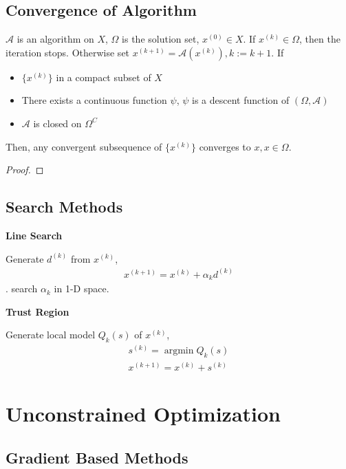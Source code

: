 \documentclass[runningheads]{llncs}
\begin{document}
\subsection{Convergence of Algorithm}
\par
\begin{theorem}
    $\mathcal{A}$ is an algorithm on $X$,
    $\Omega$ is the solution set, $x^{(0)} \in X$.
    If $x^{(k)} \in \Omega$, then the iteration stops.
    Otherwise set $x^{(k+1)} = \mathcal{A}(x^{(k)}), k:=k+1$.
    If
    \begin{itemize}
        \item $\{x^{(k)}\}$ in a compact subset of $X$
        \item There exists a continuous function $\psi$,
         $\psi$ is a descent function of $(\Omega, \mathcal{A})$
        \item $\mathcal{A}$ is closed on $\Omega^C$
    \end{itemize}
    Then, any convergent subsequence of $\{x^{(k)}\}$ converges to 
    $x, x \in \Omega$.
\end{theorem}
\begin{proof}
    
\end{proof}

\subsection{Search Methods}
\noindent\textbf{Line Search}
\par
Generate $d^{(k)}$ from 
$x^{(k)}$, 
\begin{align}
    x^{(k+1)} = x^{(k)} + \alpha_kd^{(k)}
\end{align}.
search $\alpha_k$ in 1-D space.
\par
\noindent\textbf{Trust Region}
\par
Generate local model $Q_{k}(s)$ of $x^{(k)}$,
\begin{align}
    s^{(k)} = \mathop{\arg\min} Q_k(s) \\
    x^{(k+1)} = x^{(k)} + s^{(k)}
\end{align}

\clearpage
\section{Unconstrained Optimization}

\subsection{Gradient Based Methods}
\end{document}
